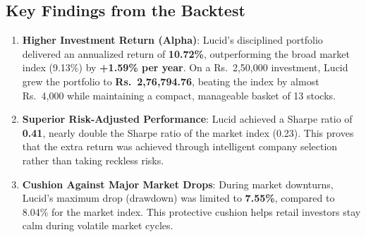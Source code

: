 \begin{table}[H]
\centering
\caption{Quantitative Performance Evaluation: Lucid vs. Baseline Benchmarks}
\label{tab:backtest_results}
\end{table}

\subsection{Key Findings from the Backtest}
\begin{enumerate}
    \item \textbf{Higher Investment Return (Alpha)}: Lucid's disciplined portfolio delivered an annualized return of \textbf{10.72\%}, outperforming the broad market index (9.13\%) by \textbf{+1.59\% per year}. On a Rs.~2,50,000 investment, Lucid grew the portfolio to \textbf{Rs.~2,76,794.76}, beating the index by almost Rs.~4,000 while maintaining a compact, manageable basket of 13 stocks.
    \item \textbf{Superior Risk-Adjusted Performance}: Lucid achieved a Sharpe ratio of \textbf{0.41}, nearly double the Sharpe ratio of the market index (0.23). This proves that the extra return was achieved through intelligent company selection rather than taking reckless risks.
    \item \textbf{Cushion Against Major Market Drops}: During market downturns, Lucid's maximum drop (drawdown) was limited to \textbf{7.55\%}, compared to 8.04\% for the market index. This protective cushion helps retail investors stay calm during volatile market cycles.
\end{enumerate}

